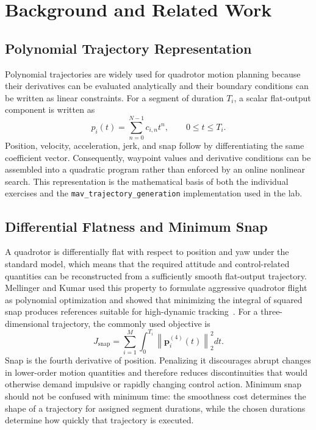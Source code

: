 \documentclass[letterpaper,10pt,conference]{IEEEtran}
\newcommand{\vect}[1]{\bm{#1}}
\begin{document}
\section{Background and Related Work}
\subsection{Polynomial Trajectory Representation}
Polynomial trajectories are widely used for quadrotor motion planning because their derivatives can be evaluated analytically and their boundary conditions can be written as linear constraints. For a segment of duration $T_i$, a scalar flat-output component is written as
\begin{equation}
p_i(t)=\sum_{n=0}^{N-1}c_{i,n}t^n,
\qquad 0\leq t\leq T_i.
\end{equation}
Position, velocity, acceleration, jerk, and snap follow by differentiating the same coefficient vector. Consequently, waypoint values and derivative conditions can be assembled into a quadratic program rather than enforced by an online nonlinear search. This representation is the mathematical basis of both the individual exercises and the \texttt{mav\_trajectory\_generation} implementation used in the lab.

\subsection{Differential Flatness and Minimum Snap}
A quadrotor is differentially flat with respect to position and yaw under the standard model, which means that the required attitude and control-related quantities can be reconstructed from a sufficiently smooth flat-output trajectory. Mellinger and Kumar used this property to formulate aggressive quadrotor flight as polynomial optimization and showed that minimizing the integral of squared snap produces references suitable for high-dynamic tracking~\cite{mellinger2011}. For a three-dimensional trajectory, the commonly used objective is
\begin{equation}
J_{\mathrm{snap}}=
\sum_{i=1}^{M}\int_0^{T_i}
\left\lVert\vect{p}_i^{(4)}(t)\right\rVert_2^2dt.
\end{equation}
Snap is the fourth derivative of position. Penalizing it discourages abrupt changes in lower-order motion quantities and therefore reduces discontinuities that would otherwise demand impulsive or rapidly changing control action. Minimum snap should not be confused with minimum time: the smoothness cost determines the shape of a trajectory for assigned segment durations, while the chosen durations determine how quickly that trajectory is executed.
\end{document}
